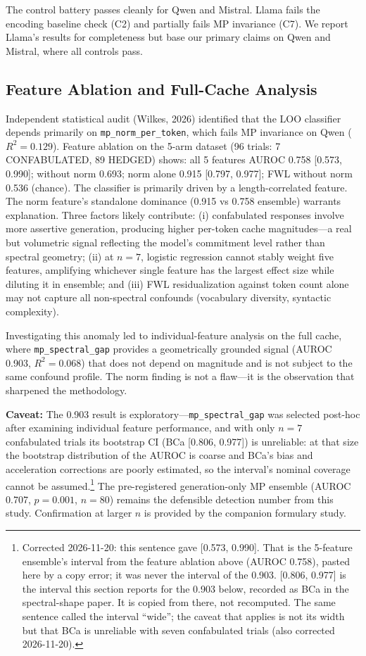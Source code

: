 The control battery passes cleanly for Qwen and Mistral. Llama fails the
encoding baseline check (C2) and partially fails MP invariance (C7). We
report Llama's results for completeness but base our primary claims on
Qwen and Mistral, where all controls pass.

\subsection{Feature Ablation and Full-Cache Analysis}
\label{sec:ablation}

Independent statistical audit (Wilkes, 2026) identified that the LOO
classifier depends primarily on \texttt{mp\_norm\_per\_token},
which fails MP invariance on Qwen ($R^2 = 0.129$). Feature ablation
on the 5-arm dataset (96 trials: 7 CONFABULATED, 89 HEDGED) shows:
all 5 features AUROC 0.758 [0.573, 0.990]; without norm 0.693;
norm alone 0.915 [0.797, 0.977]; FWL without norm 0.536 (chance).
The classifier is primarily driven by a length-correlated feature.
The norm feature's standalone dominance (0.915 vs 0.758 ensemble)
warrants explanation. Three factors likely contribute: (i) confabulated
responses involve more assertive generation, producing higher per-token
cache magnitudes---a real but volumetric signal reflecting the model's
commitment level rather than spectral geometry; (ii) at $n = 7$,
logistic regression cannot stably weight five features, amplifying
whichever single feature has the largest effect size while diluting it
in ensemble; and (iii) FWL residualization against token count alone
may not capture all non-spectral confounds (vocabulary diversity,
syntactic complexity).

Investigating this anomaly led to individual-feature analysis on
the full cache, where \texttt{mp\_spectral\_gap} provides a
geometrically grounded signal (AUROC 0.903, $R^2 = 0.068$) that does
not depend on magnitude and is not subject to the same confound
profile. The norm finding is not a flaw---it is the observation that
sharpened the methodology.

\textbf{Caveat:} The 0.903 result is exploratory---\texttt{mp\_spectral\_gap}
was selected post-hoc after examining individual feature performance,
and with only $n = 7$ confabulated trials its bootstrap CI (BCa [0.806, 0.977]) is unreliable: at that size the bootstrap distribution of the AUROC is coarse and BCa's bias and acceleration corrections are poorly estimated, so the interval's nominal coverage cannot be assumed.\footnote{Corrected 2026-11-20: this sentence gave [0.573, 0.990]. That is the 5-feature ensemble's interval from the feature ablation above (AUROC 0.758), pasted here by a copy error; it was never the interval of the 0.903. [0.806, 0.977] is the interval this section reports for the 0.903 below, recorded as BCa in the spectral-shape paper. It is copied from there, not recomputed. The same sentence called the interval ``wide''; the caveat that applies is not its width but that BCa is unreliable with seven confabulated trials (also corrected 2026-11-20).}
The pre-registered generation-only MP ensemble (AUROC 0.707, $p = 0.001$,
$n = 80$) remains the defensible detection number from this study.
Confirmation at larger $n$ is provided by the companion formulary study.

